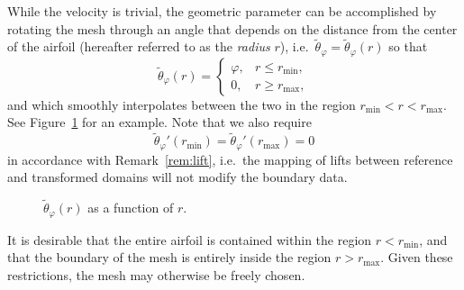 \documentclass[onecolumn, twoside, a4paper, 11pt]{article}
\begin{document}
While the velocity is trivial, the geometric
parameter can be accomplished by rotating the mesh through an angle that depends
on the distance from the center of the airfoil (hereafter referred to as the
\emph{radius} $r$), i.e.~$\tilde{\theta}_\varphi = \tilde{\theta}_\varphi(r)$
so that
\[
  \tilde{\theta}_\varphi(r) = \begin{cases}
    \varphi, & r \le r_\text{min}, \\
    0, & r \ge r_\text{max},
  \end{cases}
\]
and which smoothly interpolates between the two in the region
$r_\text{min} < r < r_\text{max}$. See Figure~\ref{fig:thetatilde} for an
example. Note that we also require
\[
  \tilde{\theta}_\varphi'(r_\text{min}) =
  \tilde{\theta}_\varphi'(r_\text{max}) = 0
\]
in accordance with Remark~\ref{rem:lift}, i.e.~the mapping of lifts between reference and
transformed domains will not modify the boundary data.
%
\begin{figure}
  \begin{center}
  \end{center}
  \caption{$\tilde{\theta}_\varphi(r)$ as a function of $r$.}
  \label{fig:thetatilde}
\end{figure}
%
It is desirable that the entire airfoil is contained within the region $r <
r_\text{min}$, and that the boundary of the mesh is entirely inside the region
$r > r_\text{max}$. Given these restrictions, the mesh may otherwise be freely
chosen.
\end{document}
